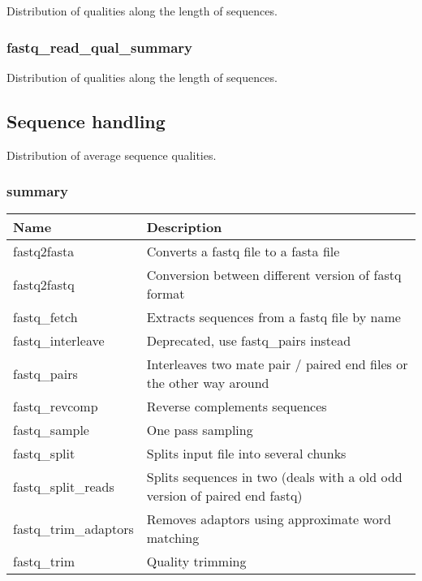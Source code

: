 \documentclass[a4paper,12pt]{article}
\begin{document}
Distribution of qualities along the length of sequences.

\subsubsection{fastq\_read\_qual\_summary}

Distribution of qualities along the length of sequences.


\subsection{Sequence handling}

Distribution of average sequence qualities.

\subsubsection{summary}

\begin{tabularx}{\textwidth}{|X|X|}
    \hline
    \textbf{Name}                   & \textbf{Description} \\
    \hline
    \hline
    fastq2fasta                     & Converts a fastq file to a fasta file \\
    fastq2fastq                     & Conversion between different version of fastq format \\
    fastq\_fetch                    & Extracts sequences from a fastq file by name \\
    fastq\_interleave               & Deprecated, use fastq\_pairs instead \\
    fastq\_pairs                    & Interleaves two mate pair / paired end files or the other way around \\
    fastq\_revcomp                  & Reverse complements sequences \\
    fastq\_sample                   & One pass sampling \\
    fastq\_split                    & Splits input file into several chunks \\
    fastq\_split\_reads             & Splits sequences in two (deals with a old odd version of paired end fastq) \\
    fastq\_trim\_adaptors           & Removes adaptors using approximate word matching \\
    fastq\_trim                     & Quality trimming \\
    \hline
\end{tabularx}
\end{document}
